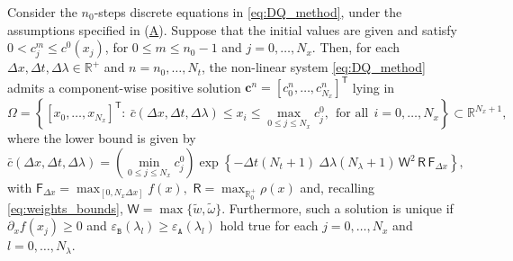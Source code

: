 \documentclass[a4paper, UKenglish, numberwithinsect, thm-restate]{tgdk-v2021}
\begin{document}
\begin{theorem}\label{thm:DQ_Properties}
    Consider the $n_0$-steps discrete equations in \eqref{eq:DQ_method}, under the assumptions specified in (\hyperref[ass:1]{A}). Suppose that the initial values are given and satisfy $0<c_j^m\leq c^0(x_j)$, for $0 \leq m\leq n_0 - 1$ and $j=0,\dots,N_x.$ Then, for each \(\Delta x, \Delta t, \Delta \lambda \in \mathbb{R}^+\) and $n=n_0,\dots,N_t$, the non-linear system \eqref{eq:DQ_method} admits a component-wise positive solution $\bm{c}^n=[c_0^n , \dots , c_{N_x}^n]^\mathsf{T}$ lying in
    \begin{equation}\label{eq:Omega}
        \Omega = \left\{[x_0,\dots,x_{N_x}]^\mathsf{T} : \ \bar{c}(\Delta x, \Delta t, \Delta \lambda) \leq x_i \leq \max_{0 \leq j \leq N_x}\! c_j^0, \ \ \text{for all} \ \ i = 0, \dots, N_x\right\} \subset \mathbb{R}^{N_x + 1},
    \end{equation}
    where the lower bound is given by
    \begin{equation}\label{eq:DQ_bound_inferiore}
        \bar{c}(\Delta x, \Delta t, \Delta \lambda) = \left(\min_{0 \leq j \leq N_x}\!c_j^0\right) \exp\left\{-\Delta t (N_t + 1) \ \Delta \lambda (N_\lambda + 1) \, \mathsf{W}^2 \, \mathsf{R} \, \mathsf{F}_{\Delta x}\right\},
    \end{equation}
    with $\mathsf{F}_{\Delta x} = \max_{[0, N_x \Delta x]} f(x),$ $\mathsf{R} = \max_{\mathbb{R}^+_0} \rho(x)$ and, recalling \eqref{eq:weights_bounds}, $\mathsf{W}=\max\{\tilde{w}, \tilde{\omega}\}.$ Furthermore, such a solution is unique if $\partial_x f(x_j)\geq 0$ and $\varepsilon_{\texttt{B}}(\lambda_l)\geq\varepsilon_{\texttt{A}}(\lambda_l)$ hold true for each $j=0,\dots, N_x$ and $l=0,\dots, N_\lambda.$
\end{theorem}
\end{document}
